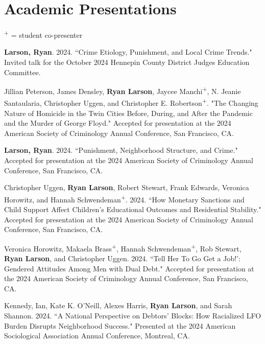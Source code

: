 \documentclass[letterpaper]{article}
\renewenvironment{itemize}{
  \begin{list}{}{
    \setlength{\leftmargin}{1.5em}
  }
}{
  \end{list}
}
\begin{document}
\section*{\textbf{Academic Presentations}} \textsuperscript{+} = student co-presenter
\begin{itemize}

\item \textbf{Larson, Ryan}. 2024. ``Crime Etiology, Punishment, and Local Crime Trends." Invited talk for the October 2024 Hennepin County District Judges Education Committee.  

\item Jillian Peterson, James Densley, \textbf{Ryan Larson}, Jaycee Manchi\textsuperscript{+}, N. Jeanie Santaularia, Christopher Uggen, and Christopher E. Robertson\textsuperscript{+}. "The Changing Nature of Homicide in the Twin Cities Before, During, and After the Pandemic and the Murder of George Floyd." Accepted for presentation at the 2024 American Society of Criminology Annual Conference, San Francisco, CA. 

\item \textbf{Larson, Ryan}. 2024. ``Punishment, Neighborhood Structure, and Crime." Accepted for presentation at the 2024 American Society of Criminology Annual Conference, San Francisco, CA. 

\item Christopher Uggen, \textbf{Ryan Larson}, Robert Stewart, Frank Edwards, Veronica Horowitz, and Hannah Schwendeman\textsuperscript{+}. 2024. ``How Monetary Sanctions and Child Support Affect Children's Educational Outcomes and Residential Stability." Accepted for presentation at the 2024 American Society of Criminology Annual Conference, San Francisco, CA. 

\item Veronica Horowitz, Makaela Brass\textsuperscript{+}, Hannah Schwendeman\textsuperscript{+}, Rob Stewart, \textbf{Ryan Larson}, and Christopher Uggen. 2024. ``Tell Her To Go Get a Job!': Gendered Attitudes Among Men with Dual Debt." Accepted for presentation at the 2024 American Society of Criminology Annual Conference, San Francisco, CA. 

\item Kennedy, Ian, Kate K. O’Neill, Alexes Harris, \textbf{Ryan Larson}, and Sarah Shannon. 2024. ``A National Perspective on Debtors’ Blocks: How Racialized LFO Burden Disrupts Neighborhood Success." Presented at the 2024 American Sociological Association Annual Conference, Montreal, CA. 


\end{itemize}
\end{document}

